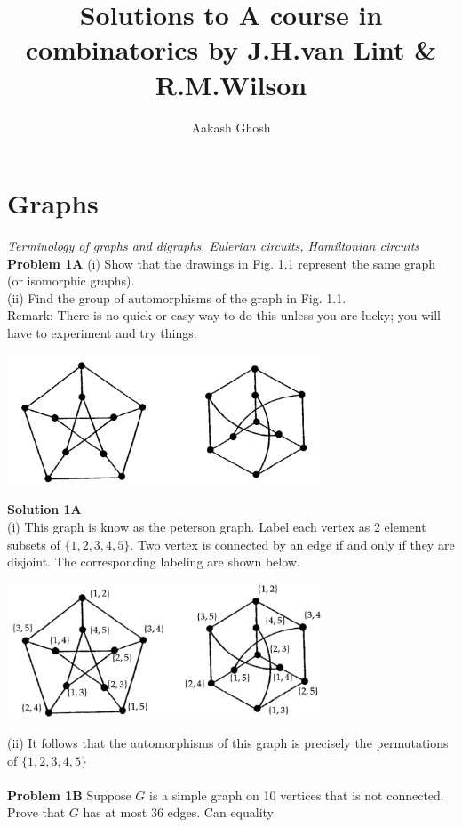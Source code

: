 \documentclass{book}
\title{Solutions to A course in combinatorics by J.H.van Lint \& R.M.Wilson}
\author{Aakash Ghosh }
\begin{document}
\maketitle
\tableofcontents

\chapter{Graphs}
\textit{Terminology of graphs and digraphs, Eulerian circuits, Hamiltonian circuits}\\
\textbf{Problem 1A} (i) Show that the drawings in Fig. 1.1 represent the
same graph (or isomorphic graphs).\\
(ii) Find the group of automorphisms of the graph in Fig. 1.1.\\
Remark: There is no quick or easy way to do this unless you are
lucky; you will have to experiment and try things.
\begin{center}
    \includegraphics[width=0.7\textwidth]{Fig1.png}
\end{center}
\textbf{Solution 1A}\\
(i) This graph is know as the peterson graph. Label each vertex as 2 element subsets of $\{1,2,3,4,5\}$. Two vertex is connected by an edge if and only if they are disjoint. The corresponding labeling are shown below. 
\begin{center}
    \includegraphics[width=0.7\textwidth]{Fig 2.png}
\end{center}
(ii) It follows that the automorphisms of this graph is precisely the permutations of $\{1,2,3,4,5\}$\\\\
\textbf{Problem 1B} Suppose $G$ is a simple graph on 10 vertices that is
not connected. Prove that $G$ has at most 36 edges. Can equality
\end{document}
